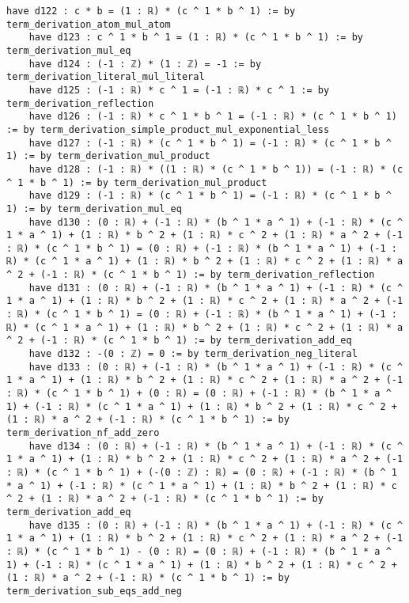 \documentclass{article}
\begin{document}
\begin{tcolorbox}[colback=white!10, width=\linewidth]
\begin{lstlisting}[language=Lean4]
    have d122 : c * b = (1 : ℝ) * (c ^ 1 * b ^ 1) := by term_derivation_atom_mul_atom
    have d123 : c ^ 1 * b ^ 1 = (1 : ℝ) * (c ^ 1 * b ^ 1) := by term_derivation_mul_eq
    have d124 : (-1 : ℤ) * (1 : ℤ) = -1 := by term_derivation_literal_mul_literal
    have d125 : (-1 : ℝ) * c ^ 1 = (-1 : ℝ) * c ^ 1 := by term_derivation_reflection
    have d126 : (-1 : ℝ) * c ^ 1 * b ^ 1 = (-1 : ℝ) * (c ^ 1 * b ^ 1) := by term_derivation_simple_product_mul_exponential_less
    have d127 : (-1 : ℝ) * (c ^ 1 * b ^ 1) = (-1 : ℝ) * (c ^ 1 * b ^ 1) := by term_derivation_mul_product
    have d128 : (-1 : ℝ) * ((1 : ℝ) * (c ^ 1 * b ^ 1)) = (-1 : ℝ) * (c ^ 1 * b ^ 1) := by term_derivation_mul_product
    have d129 : (-1 : ℝ) * (c ^ 1 * b ^ 1) = (-1 : ℝ) * (c ^ 1 * b ^ 1) := by term_derivation_mul_eq
    have d130 : (0 : ℝ) + (-1 : ℝ) * (b ^ 1 * a ^ 1) + (-1 : ℝ) * (c ^ 1 * a ^ 1) + (1 : ℝ) * b ^ 2 + (1 : ℝ) * c ^ 2 + (1 : ℝ) * a ^ 2 + (-1 : ℝ) * (c ^ 1 * b ^ 1) = (0 : ℝ) + (-1 : ℝ) * (b ^ 1 * a ^ 1) + (-1 : ℝ) * (c ^ 1 * a ^ 1) + (1 : ℝ) * b ^ 2 + (1 : ℝ) * c ^ 2 + (1 : ℝ) * a ^ 2 + (-1 : ℝ) * (c ^ 1 * b ^ 1) := by term_derivation_reflection
    have d131 : (0 : ℝ) + (-1 : ℝ) * (b ^ 1 * a ^ 1) + (-1 : ℝ) * (c ^ 1 * a ^ 1) + (1 : ℝ) * b ^ 2 + (1 : ℝ) * c ^ 2 + (1 : ℝ) * a ^ 2 + (-1 : ℝ) * (c ^ 1 * b ^ 1) = (0 : ℝ) + (-1 : ℝ) * (b ^ 1 * a ^ 1) + (-1 : ℝ) * (c ^ 1 * a ^ 1) + (1 : ℝ) * b ^ 2 + (1 : ℝ) * c ^ 2 + (1 : ℝ) * a ^ 2 + (-1 : ℝ) * (c ^ 1 * b ^ 1) := by term_derivation_add_eq
    have d132 : -(0 : ℤ) = 0 := by term_derivation_neg_literal
    have d133 : (0 : ℝ) + (-1 : ℝ) * (b ^ 1 * a ^ 1) + (-1 : ℝ) * (c ^ 1 * a ^ 1) + (1 : ℝ) * b ^ 2 + (1 : ℝ) * c ^ 2 + (1 : ℝ) * a ^ 2 + (-1 : ℝ) * (c ^ 1 * b ^ 1) + (0 : ℝ) = (0 : ℝ) + (-1 : ℝ) * (b ^ 1 * a ^ 1) + (-1 : ℝ) * (c ^ 1 * a ^ 1) + (1 : ℝ) * b ^ 2 + (1 : ℝ) * c ^ 2 + (1 : ℝ) * a ^ 2 + (-1 : ℝ) * (c ^ 1 * b ^ 1) := by term_derivation_nf_add_zero
    have d134 : (0 : ℝ) + (-1 : ℝ) * (b ^ 1 * a ^ 1) + (-1 : ℝ) * (c ^ 1 * a ^ 1) + (1 : ℝ) * b ^ 2 + (1 : ℝ) * c ^ 2 + (1 : ℝ) * a ^ 2 + (-1 : ℝ) * (c ^ 1 * b ^ 1) + (-(0 : ℤ) : ℝ) = (0 : ℝ) + (-1 : ℝ) * (b ^ 1 * a ^ 1) + (-1 : ℝ) * (c ^ 1 * a ^ 1) + (1 : ℝ) * b ^ 2 + (1 : ℝ) * c ^ 2 + (1 : ℝ) * a ^ 2 + (-1 : ℝ) * (c ^ 1 * b ^ 1) := by term_derivation_add_eq
    have d135 : (0 : ℝ) + (-1 : ℝ) * (b ^ 1 * a ^ 1) + (-1 : ℝ) * (c ^ 1 * a ^ 1) + (1 : ℝ) * b ^ 2 + (1 : ℝ) * c ^ 2 + (1 : ℝ) * a ^ 2 + (-1 : ℝ) * (c ^ 1 * b ^ 1) - (0 : ℝ) = (0 : ℝ) + (-1 : ℝ) * (b ^ 1 * a ^ 1) + (-1 : ℝ) * (c ^ 1 * a ^ 1) + (1 : ℝ) * b ^ 2 + (1 : ℝ) * c ^ 2 + (1 : ℝ) * a ^ 2 + (-1 : ℝ) * (c ^ 1 * b ^ 1) := by term_derivation_sub_eqs_add_neg

\end{lstlisting}
\end{tcolorbox}
\end{document}
